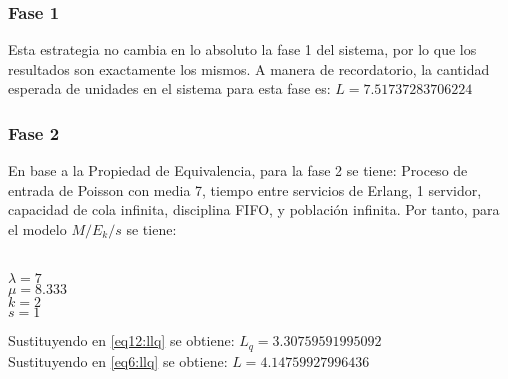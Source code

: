 \documentclass{article}
\begin{document}
\subsubsection{Fase 1}
Esta estrategia no cambia en lo absoluto la fase 1 del sistema, por lo que 
los resultados son exactamente los mismos. A manera de recordatorio,
la cantidad esperada de unidades en el sistema para esta fase es:
$ L = 7.51737283706224$
\subsubsection{Fase 2}
En base a la Propiedad de Equivalencia, para la fase 2 se tiene:
Proceso de entrada de Poisson con media 7, tiempo entre servicios 
de Erlang, 1 servidor, capacidad de cola infinita, disciplina FIFO, y población infinita.
Por tanto, para el modelo $M/E_{k}/s$ se tiene: \\\\
\begin{Large}
$\lambda = 7$\\
$\mu = 8.333$\\
$k = 2$\\
$s = 1$\\
\end{Large}
Sustituyendo en \ref{eq12:llq} se obtiene: $L_{q} = 3.30759591995092$\\
Sustituyendo en \ref{eq6:llq} se obtiene: $L = 4.14759927996436$
\end{document}
